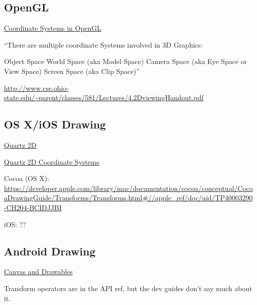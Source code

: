 \documentclass[12pt]{tufte-handout}
\numberwithin{equation}{subsection}
\numberwithin{equation}{subsection}
\begin{document}
\begin{appendices}
                \subsection{OpenGL}
                \label{subs:opengl}


                \href{http://www.matrix44.net/cms/notes/opengl-3d-graphics/coordinate-systems-in-opengl}{Coordinate Systems in OpenGL}

                ``There are multiple coordinate Systems involved in 3D Graphics:

                Object Space
                World Space (aka Model Space)
                Camera Space (aka Eye Space or View Space)
                Screen Space (aka Clip Space)''

                \url{http://www.cse.ohio-state.edu/~parent/classes/581/Lectures/4.2DviewingHandout.pdf}

                \subsection{OS X/iOS Drawing}

                \href{https://developer.apple.com/library/mac/documentation/graphicsimaging/conceptual/drawingwithquartz2d/dq\_overview/dq\_overview.html}{Quartz 2D}

                \href{https://developer.apple.com/library/mac/documentation/graphicsimaging/conceptual/drawingwithquartz2d/dq\_overview/dq\_overview.html#//apple\_ref/doc/uid/TP30001066-CH202-CJBBAEEC}{Quartz 2D Coordinate Systems}

                Cocoa (OS X):  \url{https://developer.apple.com/library/mac/documentation/cocoa/conceptual/CocoaDrawingGuide/Transforms/Transforms.html#//apple\_ref/doc/uid/TP40003290-CH204-BCIDJJBI}

                iOS:  ??

                \subsection{Android Drawing}

                \href{http://developer.android.com/guide/topics/graphics/2d-graphics.html}{Canvas and Drawables}

                Transform operators are in the API ref, but the dev guides don't say much about it.


\end{appendices}
\end{document}
